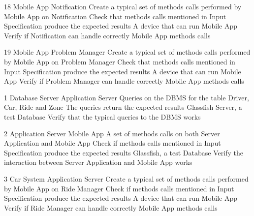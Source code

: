 \testCase
	{18}
	{Mobile App}
	{Notification}
	{Create a typical set of methods calls performed by Mobile App on Notification}
	{Check that methods calls mentioned in Input Specification produce the expected results}
	{A device that can run Mobile App}
	{Verify  if Notification can handle correctly Mobile App methods calls}

\testCase
	{19}
	{Mobile App}
	{Problem Manager}
	{Create a typical set of methods calls performed by Mobile App on Problem Manager}
	{Check that methods calls mentioned in Input Specification produce the expected results}
	{A device that can run Mobile App}
	{Verify  if Problem Manager can handle correctly Mobile App methods calls}	
	
	
\testCaseSub
	{1}
	{Database Server}
	{Application Server}
	{Queries on the DBMS for the table Driver, Car, Ride and Zone}
	{The queries return the expected results}
	{Glassfish Server, a test Database}
	{Verify that the typical queries to the DBMS  works}

\testCaseSub
	{2}
	{Application Server}
	{Mobile App}
	{A set of methods calls on both Server Application and Mobile App }
	{Check if methods calls mentioned in Input Specification produce the expected results}
	{Glassfish, a test Database}
	{Verify the interaction between Server Application and Mobile App works}


	
\testCaseSub
	{3}
	{Car System}
	{Application Server}
	{Create a typical set of methods calls performed by Mobile App on Ride Manager}
	{Check if methods calls mentioned in Input Specification produce the expected results}
	{A device that can run Mobile App}
	{Verify  if Ride Manager can handle correctly Mobile App methods calls}

